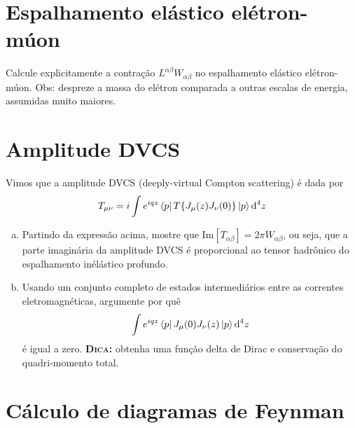 \documentclass[a4paper, 11pt, oneside]{impression}
\begin{document}


\newpage

\chapter{Espalhamento elástico elétron-múon}\label{quest: six}

\begin{exercise}{}
    Calcule explicitamente a contração $L^{\alpha\beta}W_{\alpha\beta}$ no espalhamento elástico elétron-múon. Obs: despreze a massa do elétron comparada a outras escalas de energia, assumidas muito maiores.
\end{exercise}



\newpage

\chapter{Amplitude DVCS}\label{quest: seven}

\begin{exercise}{}
    Vimos que a amplitude DVCS (deeply-virtual Compton scattering) é dada por
        \begin{equation*}
            T_{\mu\nu} = i\int e^{iqz}\bra{p}T\{J_{\mu}(z)J_{\nu}(0)\}\ket{p}\dd[4]{z}
        \end{equation*}
    \begin{enumerate}[(a)]
        \item Partindo da expressão acima, mostre que $\text{Im}[T_{\alpha\beta}] = 2\pi W_{\alpha\beta}$, ou seja, que a parte imaginária da amplitude DVCS é proporcional ao tensor hadrônico do espalhamento inélástico profundo.
        \item Usando um conjunto completo de estados intermediários entre as correntes eletromagnéticas, argumente por quê
            \begin{equation*}
                \int e^{iqz} \bra{p}J_{\mu}(0)J_{\nu}(z)\ket{p}\dd[4]{z}
            \end{equation*}
        é igual a zero. \textbf{\textsc{Dica:}} obtenha uma função delta de Dirac e conservação do quadri-momento total.
    \end{enumerate}
\end{exercise}



\newpage

\chapter{Cálculo de diagramas de Feynman}\label{quest: eight}
\end{document}
